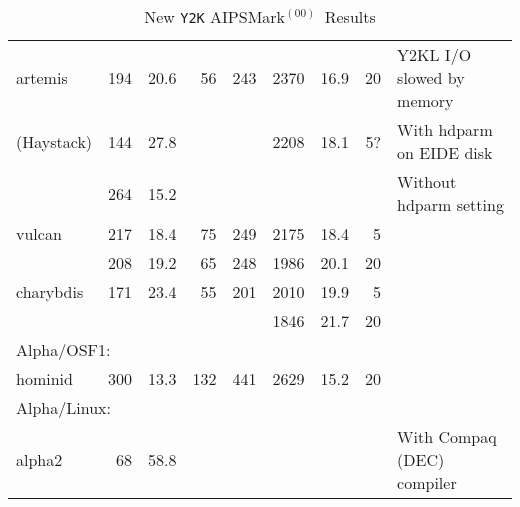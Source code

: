 \documentclass[twoside]{article}
\newcommand{\AMark}{AIPSMark$^{(00)}$}
\begin{document}
\begin{table}
\begin{center}
\begin{tabular}{|l|rr|rrrr|rl|}
artemis  & 194&20.6& 56& 243& 2370&16.9& 20&Y2KL I/O slowed by memory\\
(Haystack)&144&27.8&   &    & 2208&18.1& 5?&With hdparm on EIDE disk\\
         & 264&15.2&   &    &     &    &   &Without hdparm setting\\
vulcan   & 217&18.4& 75& 249& 2175&18.4&  5& \\
         & 208&19.2& 65& 248& 1986&20.1& 20& \\
charybdis& 171&23.4& 55& 201& 2010&19.9&  5& \\
         &    &    &   &    & 1846&21.7& 20& \\
\hline
\multicolumn{9}{|l|}{Alpha/OSF1:}\\
\hline
 hominid & 300&13.3&132& 441& 2629&15.2& 20&\\
\hline
\multicolumn{9}{|l|}{Alpha/Linux:}\\
\hline
 alpha2  & 68&58.8&   &    &     &    &   &With Compaq (DEC) compiler \\
\hline
\end{tabular}
\end{center}
\caption{New {\tt Y2K} \AMark\ Results}
\label{ta:newAm}
\end{table}
\end{document}
